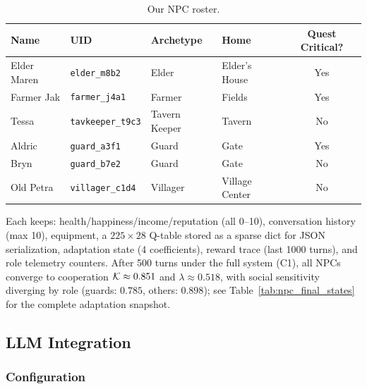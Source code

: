\begin{table}[ht]
\centering
\caption{Our NPC roster.}
\label{tab:npcs}
\begin{tabular}{@{}llllc@{}}
\toprule
Name & UID & Archetype & Home & Quest Critical? \\
\midrule
Elder Maren & \texttt{elder\_m8b2} & Elder & Elder's House & Yes \\
Farmer Jak & \texttt{farmer\_j4a1} & Farmer & Fields & Yes \\
Tessa & \texttt{tavkeeper\_t9c3} & Tavern Keeper & Tavern & No \\
Aldric & \texttt{guard\_a3f1} & Guard & Gate & Yes \\
Bryn & \texttt{guard\_b7e2} & Guard & Gate & No \\
Old Petra & \texttt{villager\_c1d4} & Villager & Village Center & No \\
\bottomrule
\end{tabular}
\end{table}

Each keeps: health/happiness/income/reputation (all 0--10), conversation history (max 10), equipment, a $225 \times 28$ Q-table stored as a sparse dict for JSON serialization, adaptation state (4 coefficients), reward trace (last 1000 turns), and role telemetry counters. After 500 turns under the full system (C1), all NPCs converge to cooperation $\mathcal{K} \approx 0.851$ and $\lambda \approx 0.518$, with social sensitivity diverging by role (guards: $0.785$, others: $0.898$); see Table~\ref{tab:npc_final_states} for the complete adaptation snapshot.

\subsection{LLM Integration}

\subsubsection{Configuration}

